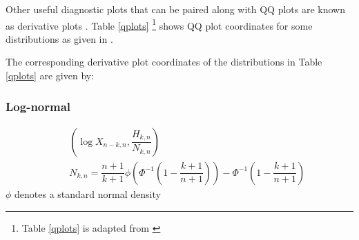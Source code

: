 \begin{table}[t]
\centering
\caption{Q-Q plot and derivatives plot coordinates.}
\label{qplots}
\end{table}

Other useful diagnostic plots that can be paired along with QQ plots are known as derivative plots \citep[see][for more details]{albrecher2017reinsurance}. Table \ref{qplots} \footnote{Table \ref{qplots} is adapted from \cite{sts626}} shows QQ plot coordinates for some distributions as given in \cite{sts626}. 

The corresponding derivative plot coordinates of the distributions in Table \ref{qplots} are given by:
\subsubsection*{Log-normal}
\begin{eqnarray*}
&&\left(\log X_{n-k,n}, \dfrac{H_{k,n}}{N_{k,n}} \right)\\
&&N_{k,n} = \dfrac{n+1}{k+1} \phi \left( \Phi^{-1}\left(1-\dfrac{k+1}{n+1}\right) \right)- \Phi^{-1}\left(1-\dfrac{k+1}{n+1}\right) 
\end{eqnarray*}$\phi$ denotes a standard normal density

